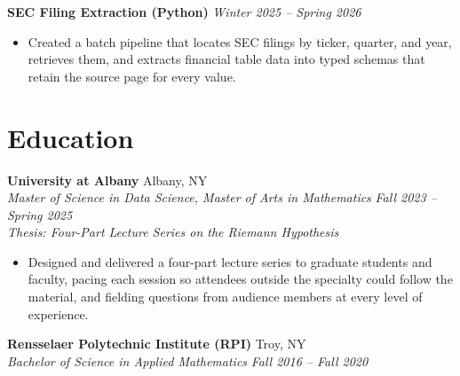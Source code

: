 \documentclass[10pt,letterpaper]{article}
\begin{document}
\noindent \textbf{SEC Filing Extraction (Python)} \hfill \textit{Winter 2025 -- Spring 2026}
\begin{itemize}[noitemsep, topsep=2pt]
    \item Created a batch pipeline that locates SEC filings by ticker, quarter, and year, retrieves them, and extracts financial table data into typed schemas that retain the source page for every value.
\end{itemize}

\section*{Education}

\noindent\begin{minipage}{\linewidth} %
\textbf{University at Albany} \hfill Albany, NY \\
\textit{Master of Science in Data Science, Master of Arts in Mathematics} \hfill \textit{Fall 2023 -- Spring 2025} \\
\textit{Thesis: Four-Part Lecture Series on the Riemann Hypothesis}
\begin{itemize}[noitemsep, topsep=2pt]
    \item Designed and delivered a four-part lecture series to graduate students and faculty, pacing each session so attendees outside the specialty could follow the material, and fielding questions from audience members at every level of experience.
\end{itemize}
\end{minipage}\par

\vspace{6pt}

\noindent \textbf{Rensselaer Polytechnic Institute (RPI)} \hfill Troy, NY \\
\textit{Bachelor of Science in Applied Mathematics} \hfill \textit{Fall 2016 -- Fall 2020}
\end{document}
